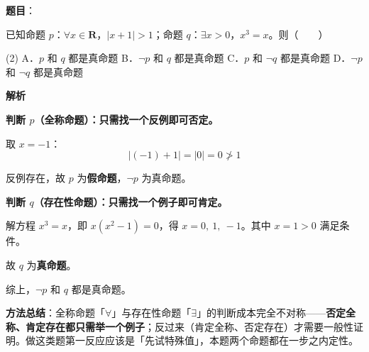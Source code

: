 \begin{answer}

\textbf{题目}：

已知命题 $p$：$\forall x\in\mathbf R$，$|x+1|>1$；命题 $q$：$\exists x>0$，$x^{3}=x$。则\mbox{（　　）}

\begin{gkopts}(2)
\task A．$p$ 和 $q$ 都是真命题
\task B．$\neg p$ 和 $q$ 都是真命题
\task C．$p$ 和 $\neg q$ 都是真命题
\task D．$\neg p$ 和 $\neg q$ 都是真命题
\end{gkopts}

\textbf{解析}

\textbf{判断 $p$（全称命题）：只需找一个反例即可否定。}

取 $x=-1$：
\nopagebreak[4]
\[|(-1)+1|=|0|=0\not>1\]

反例存在，故 $p$ 为\textbf{假命题}，$\neg p$ 为真命题。

\textbf{判断 $q$（存在性命题）：只需找一个例子即可肯定。}

解方程 $x^{3}=x$，即 $x\left(x^{2}-1\right)=0$，得 $x=0,\ 1,\ -1$。其中 $x=1>0$ 满足条件。

故 $q$ 为\textbf{真命题}。

综上，$\neg p$ 和 $q$ 都是真命题。

\begin{gktip}
\textbf{方法总结}：全称命题「$\forall$」与存在性命题「$\exists$」的判断成本完全不对称——\textbf{否定全称、肯定存在都只需举一个例子}；反过来（肯定全称、否定存在）才需要一般性证明。做这类题第一反应应该是「先试特殊值」，本题两个命题都在一步之内定性。
\end{gktip}


\par\medskip

\end{answer}
